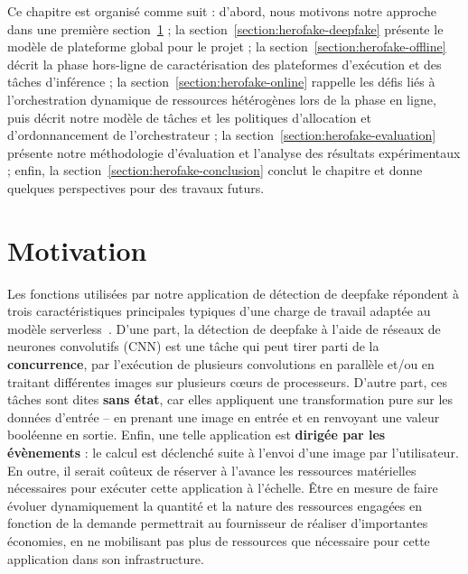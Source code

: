Ce chapitre est organisé comme suit : d'abord, nous motivons notre approche dans une première section~\ref{section:herofake-motivation} ; la section~\ref{section:herofake-deepfake} présente le modèle de plateforme global pour le projet ; la section~\ref{section:herofake-offline} décrit la phase hors-ligne de caractérisation des plateformes d'exécution et des tâches d'inférence ; la section~\ref{section:herofake-online} rappelle les défis liés à l'orchestration dynamique de ressources hétérogènes lors de la phase en ligne, puis décrit notre modèle de tâches et les politiques d'allocation et d'ordonnancement de l'orchestrateur ; la section~\ref{section:herofake-evaluation} présente notre méthodologie d'évaluation et l'analyse des résultats expérimentaux ; enfin, la section~\ref{section:herofake-conclusion} conclut le chapitre et donne quelques perspectives pour des travaux futurs.

\section{Motivation}
\label{section:herofake-motivation}

Les fonctions utilisées par notre application de détection de deepfake répondent à trois caractéristiques principales typiques d'une charge de travail adaptée au modèle serverless~\cite{cncf2018whitepaper}. D'une part, la détection de deepfake à l'aide de réseaux de neurones convolutifs (CNN) est une tâche qui peut tirer parti de la \textbf{concurrence}, par l'exécution de plusieurs convolutions en parallèle et/ou en traitant différentes images sur plusieurs cœurs de processeurs. D'autre part, ces tâches sont dites \textbf{sans état}, car elles appliquent une transformation pure sur les données d'entrée -- en prenant une image en entrée et en renvoyant une valeur booléenne en sortie. Enfin, une telle application est \textbf{dirigée par les évènements} : le calcul est déclenché suite à l'envoi d'une image par l'utilisateur.
En outre, il serait coûteux de réserver à l'avance les ressources matérielles nécessaires pour exécuter cette application à l'échelle. Être en mesure de faire évoluer dynamiquement la quantité et la nature des ressources engagées en fonction de la demande permettrait au fournisseur de réaliser d'importantes économies, en ne mobilisant pas plus de ressources que nécessaire pour cette application dans son infrastructure.

